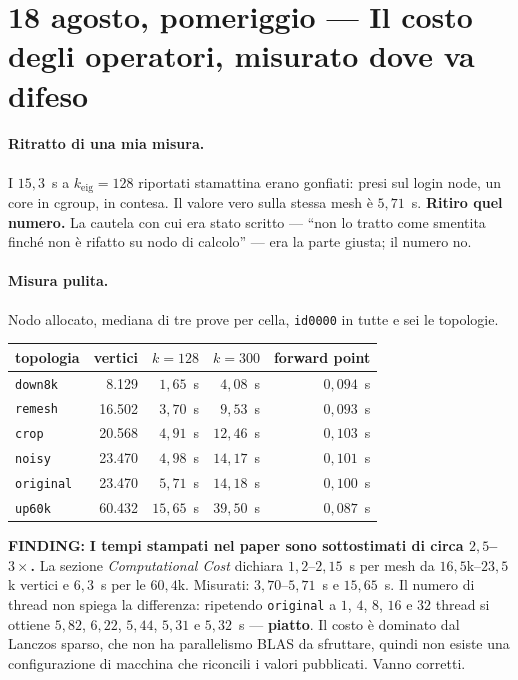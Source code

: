 \documentclass[11pt,a4paper]{article}
\newcommand{\finding}[1]{\textcolor{finding}{\textbf{FINDING:}} #1}
\begin{document}
\section{18 agosto, pomeriggio --- Il costo degli operatori, misurato dove va difeso}

\paragraph{Ritratto di una mia misura.} I $15{,}3$~s a $k_{\mathrm{eig}}=128$ riportati stamattina
erano gonfiati: presi sul login node, un core in cgroup, in contesa. Il valore vero sulla stessa
mesh \`e $5{,}71$~s. \textbf{Ritiro quel numero.} La cautela con cui era stato scritto ---
``non lo tratto come smentita finch\'e non \`e rifatto su nodo di calcolo'' --- era la parte
giusta; il numero no.

\paragraph{Misura pulita.} Nodo allocato, mediana di tre prove per cella, \texttt{id0000} in
tutte e sei le topologie.

\begin{center}\small
\begin{tabular}{lrrrr}
\toprule
topologia & vertici & $k{=}128$ & $k{=}300$ & forward point \\
\midrule
\texttt{down8k}   &  8.129 &  $1{,}65$~s &  $4{,}08$~s & $0{,}094$~s \\
\texttt{remesh}   & 16.502 &  $3{,}70$~s &  $9{,}53$~s & $0{,}093$~s \\
\texttt{crop}     & 20.568 &  $4{,}91$~s & $12{,}46$~s & $0{,}103$~s \\
\texttt{noisy}    & 23.470 &  $4{,}98$~s & $14{,}17$~s & $0{,}101$~s \\
\texttt{original} & 23.470 &  $5{,}71$~s & $14{,}18$~s & $0{,}100$~s \\
\texttt{up60k}    & 60.432 & $15{,}65$~s & $39{,}50$~s & $0{,}087$~s \\
\bottomrule
\end{tabular}
\end{center}

\finding{\textbf{I tempi stampati nel paper sono sottostimati di circa $2{,}5$--$3\times$.} La
sezione \emph{Computational Cost} dichiara $1{,}2$--$2{,}15$~s per mesh da $16{,}5$k--$23{,}5$k
vertici e $6{,}3$~s per le $60{,}4$k. Misurati: $3{,}70$--$5{,}71$~s e $15{,}65$~s. Il numero di
thread non spiega la differenza: ripetendo \texttt{original} a $1$, $4$, $8$, $16$ e $32$ thread
si ottiene $5{,}82$, $6{,}22$, $5{,}44$, $5{,}31$ e $5{,}32$~s --- \textbf{piatto}. Il costo \`e
dominato dal Lanczos sparso, che non ha parallelismo BLAS da sfruttare, quindi non esiste una
configurazione di macchina che riconcili i valori pubblicati. Vanno corretti.}
\end{document}
